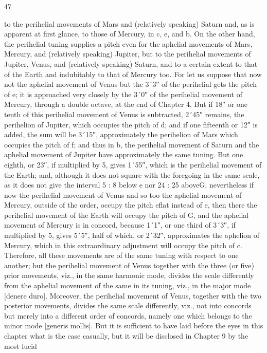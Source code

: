 \documentclass{article}
\begin{document}
47

to the perihelial movements of Mars and (relatively speaking) Saturn
and, as is apparent at first glance, to those of Mercury, in c, e, and b. On
the other hand, the perihelial tuning supplies a pitch even for the
aphelial movements of Mars, Mercury, and (relatively speaking) Jupiter,
but to the perihelial movements of Jupiter, Venus, and (relatively
speaking) Saturn, and to a certain extent to that of the Earth and
indubitably to that of Mercury too. For let us suppose that now not the
aphelial movement of Venus but the 3´3″ of the perihelial gets the pitch
of e; it is approached very closely by the 3´0″ of the perihelial movement
of Mercury, through a double octave, at the end of Chapter 4. But if 18″
or one tenth of this perihelial movement of Venus is subtracted, 2´45″
remains, the perihelion of Jupiter, which occupies the pitch of d; and if
one fifteenth or 12″ is added, the sum will be 3´15″, approximately the
perihelion of Mars which occupies the pitch of f; and thus in b, the
perihelial movement of Saturn and the aphelial movement of Jupiter
have approximately the same tuning. But one eighth, or 23″, if
multiplied by 5, gives 1´55″, which is the perihelial movement of the
Earth; and, although it does not square with the foregoing in the same
scale, as it does not give the interval 5 : 8 below e nor 24 : 25 aboveG,
nevertheless if now the perihelial movement of Venus and so too the
aphelial movement of Mercury, outside of the order, occupy the pitch eflat instead of e, then there the perihelial movement of the Earth will
occupy the pitch of G, and the aphelial movement of Mercury is in
concord, because 1´1″, or one third of 3´3″, if multiplied by 5, gives
5´5″, half of which, or 2´32″, approximates the aphelion of Mercury,
which in this extraordinary adjustment will occupy the pitch of c.
Therefore, all these movements are of the same tuning with respect to
one another; but the perihelial movement of Venus together with the
three (or five) prior movements, viz., in the same harmonic mode,
divides the scale differently from the aphelial movement of the same in
its tuning, viz., in the major mode [denere duro]. Moreover, the
perihelial movement of Venus, together with the two posterior
movements, divides the same scale differently, viz., not into concords
but merely into a different order of concords, namely one which belongs
to the minor mode [generis mollis].
But it is sufficient to have laid before the eyes in this chapter what is the
case casually, but it will be disclosed in Chapter 9 by the most lucid
\end{document}
